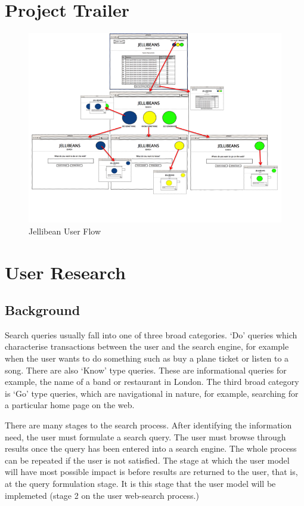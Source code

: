 \documentclass[a4paper, 11pt]{article}
\begin{document}
\section{Project Trailer}

\begin{figure}[H]
\begin{center}
\includegraphics[scale=0.7]{JellibeanFlow}
\end{center}
\caption{Jellibean User Flow}
\label{JBeanUserFlow}
\end{figure}


\section {User Research}
\subsection{Background}\label{background} 
Search queries usually fall into one of three broad categories.  `Do' queries which characterise transactions between the user and the search engine, for example when the user wants to do something such as buy a plane ticket or listen to a song. There are also `Know' type queries. These are informational queries for example, the name of a band or restaurant in London. The third broad category is `Go' type queries, which are navigational in nature, for example, searching for a particular home page on the web. 

There are many stages to the search process. After identifying the information need, the user must formulate a search query. The user must browse through results once the query has been entered into a search engine. The whole process can be repeated if the user is not satisfied. The stage at which the user model will have most possible impact is before results are returned to the user, that is, at the query formulation stage. It is this stage that the user model will be implemeted (stage 2 on the user web-search process.)
\end{document}
